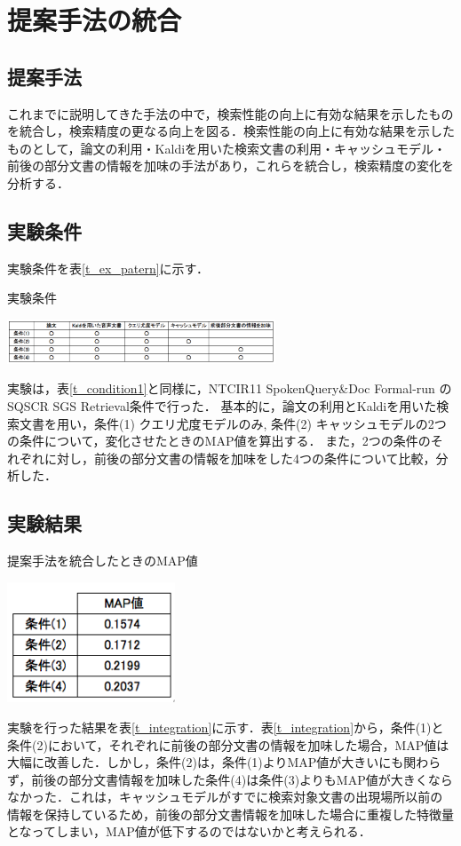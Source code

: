 \chapter{提案手法の統合}

\section{提案手法}

これまでに説明してきた手法の中で，検索性能の向上に有効な結果を示したものを統合し，検索精度の更なる向上を図る．検索性能の向上に有効な結果を示したものとして，論文の利用・Kaldiを用いた検索文書の利用・キャッシュモデル・前後の部分文書の情報を加味の手法があり，これらを統合し，検索精度の変化を分析する．

\section{実験条件}
実験条件を表\ref{t_ex_patern}に示す．

\begin{table}[h]
    \centering
    \caption{実験条件}
    \includegraphics[width=8cm]{./image/t_ex_patern2.png}
    \label{t_ex_patern}
\end{table}
実験は，表\ref{t_condition1}と同様に，NTCIR11 SpokenQuery\&Doc Formal-run の SQSCR SGS Retrieval条件で行った．
基本的に，論文の利用とKaldiを用いた検索文書を用い，条件(1) クエリ尤度モデルのみ, 条件(2) キャッシュモデルの2つの条件について，変化させたときのMAP値を算出する．
また，2つの条件のそれぞれに対し，前後の部分文書の情報を加味をした4つの条件について比較，分析した．

\section{実験結果}

\begin{table}[htbp]
    \centering
    \caption{提案手法を統合したときのMAP値}
    \includegraphics[width=5cm]{./image/t_integration4.png}
    \label{t_integration}
\end{table}

実験を行った結果を表\ref{t_integration}に示す．表\ref{t_integration}から，条件(1)と条件(2)において，それぞれに前後の部分文書の情報を加味した場合，MAP値は大幅に改善した．しかし，条件(2)は，条件(1)よりMAP値が大きいにも関わらず，前後の部分文書情報を加味した条件(4)は条件(3)よりもMAP値が大きくならなかった．これは，キャッシュモデルがすでに検索対象文書の出現場所以前の情報を保持しているため，前後の部分文書情報を加味した場合に重複した特徴量となってしまい，MAP値が低下するのではないかと考えられる．

